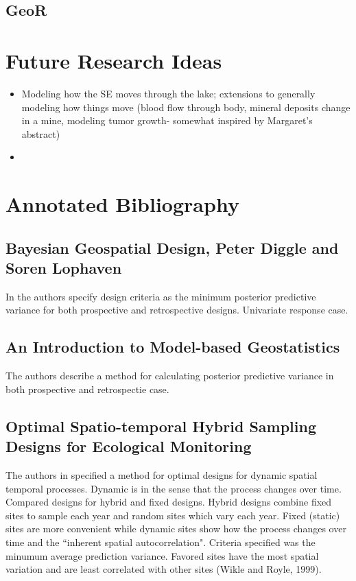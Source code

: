 \documentclass[a4paper]{article}\usepackage[]{graphicx}\usepackage[]{color}
\begin{document}
\subsection*{GeoR}


\section*{Future Research Ideas}
\begin{itemize}

\item Modeling how the SE moves through the lake; extensions to generally modeling how things move (blood flow through body, mineral deposits change in a mine, modeling tumor growth- somewhat inspired by Margaret's abstract)

\item

\end{itemize}



\section*{Annotated Bibliography}


\subsection*{Bayesian Geospatial Design, Peter Diggle and Soren Lophaven}
In \cite{diggle2006} the authors specify design criteria as the minimum posterior predictive variance for both prospective and retrospective designs. Univariate response case. 


\subsection*{An Introduction to Model-based Geostatistics}

The authors describe a method for calculating posterior predictive variance in both prospective and retrospectie case. \cite{diggle2003}

\subsection*{Optimal Spatio-temporal Hybrid Sampling Designs for Ecological Monitoring}

The authors in \cite{hooten2009} specified a method for optimal designs for dynamic spatial temporal processes. Dynamic is in the sense that the process changes over time. Compared designs for hybrid and fixed designs. Hybrid designs combine fixed sites to sample each year and random sites which vary each year. Fixed (static) sites are more convenient while dynamic sites show how the process changes over time and the ``inherent spatial autocorrelation". Criteria specified was the minumum average prediction variance. Favored sites have the most spatial variation and are least correlated with other sites (Wikle and Royle, 1999).
\end{document}
